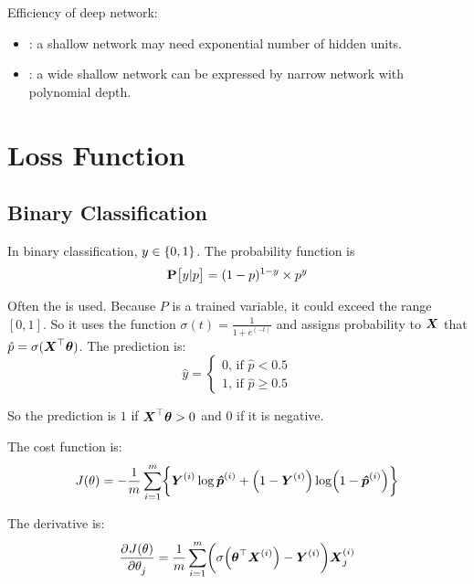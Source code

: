 Efficiency of deep network:
\begin{itemize}
    \item {}: a shallow network may need exponential number of hidden units.
    \item {}: a wide shallow network can be expressed by narrow network with polynomial depth.
\end{itemize}



\section{Loss Function}

\subsection{Binary Classification}

In binary classification, $y \in \set{0,1}$. The probability function is
\begin{equation}
    \probability{y|p} = (1-p)^{1-y} \times p^y
\end{equation}


Often the  is used. Because $P$ is a trained variable, it could exceed the range $[0, 1]$. So it uses the  function $\sigma(t) = \frac{1}{1 + e^(-t)}$ and assigns probability to $\boldsymbol{X}$ that $\hat{p} = \sigma(\boldsymbol{X}^\top \boldsymbol{\theta} )$. The prediction is:
\begin{equation}
	\hat{y} = \begin{cases}
		0 \text{, if } \hat{p} < 0.5 \\
		1 \text{, if } \hat{p} \geq 0.5
	\end{cases}
\end{equation}

So the prediction is $1$ if $\boldsymbol{X}^\top \boldsymbol{\theta} > 0$ and $0$ if it is negative.

The  cost function is:
\begin{equation}
	J(\theta) = - \frac{1}{m} \sum_{i=1}^m \mleft\{ \subscription{Y}{i} \log \subscription{\hat{p}}{i} + \mleft(1- \subscription{Y}{i} \mright) \log \mleft(1 - \subscription{\hat{p}}{i} \mright) \mright\}
\end{equation}

The derivative is:
\begin{equation}
	\dpd{J(\theta)}{\theta_j} = \frac{1}{m} \sum_{i=1}^m \mleft( \sigma \mleft(\columnvector{\theta}^\top \subscription{X}{i} \mright) - \subscription{Y}{i} \mright) \subscription{X}{i}_j
\end{equation}






